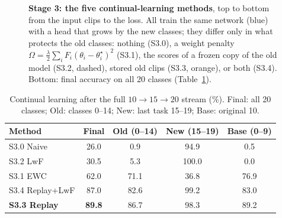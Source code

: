 \documentclass[conference]{IEEEtran}
\newcommand{\colhead}[4]{%
  \node[draw, rectangle split, rectangle split horizontal, rectangle split parts=2,
        rectangle split part fill={green!26,green!9}, rounded corners=1.5pt, minimum height=5mm,
        inner sep=0.8mm, font=\tiny] (#1) at (#2) {#3\nodepart{two}#4};}
\begin{document}
\begin{figure}[t]
{}
\caption{\textbf{Stage 3: the five continual-learning methods}, top to bottom from the input
clips to the loss. All train the same network (blue) with a head that grows by the new
classes; they differ only in what protects the old classes: nothing (S3.0), a weight penalty
$\Omega=\tfrac{\lambda}{2}\sum_i F_i(\theta_i-\theta_i^\star)^2$ (S3.1), the scores of a frozen
copy of the old model (S3.2, dashed), stored old clips (S3.3, orange), or both (S3.4).
Bottom: final accuracy on all 20 classes (Table~\ref{tab:cl}).}
\label{fig:cl}
\end{figure}

\begin{table}[t]
\centering
\caption{Continual learning after the full $10\!\to\!15\!\to\!20$ stream (\%). Final: all
20 classes; Old: classes 0--14; New: last task 15--19; Base: original 10.}
\label{tab:cl}
\renewcommand{\arraystretch}{1.1}
\begin{tabular}{lcccc}
\toprule
Method & Final & Old (0--14) & New (15--19) & Base (0--9) \\
\midrule
S3.0 Naive             & 26.0 & 0.9  & 94.9 & 0.5 \\
S3.2 LwF               & 30.5 & 5.3  & 100.0 & 0.0 \\
S3.1 EWC               & 62.0 & 71.1 & 36.8 & 76.9 \\
S3.4 Replay+LwF        & 87.0 & 82.6 & 99.2 & 83.0 \\
\textbf{S3.3 Replay}   & \textbf{89.8} & 86.7 & 98.3 & 89.2 \\
\bottomrule
\end{tabular}
\end{table}
\end{document}
